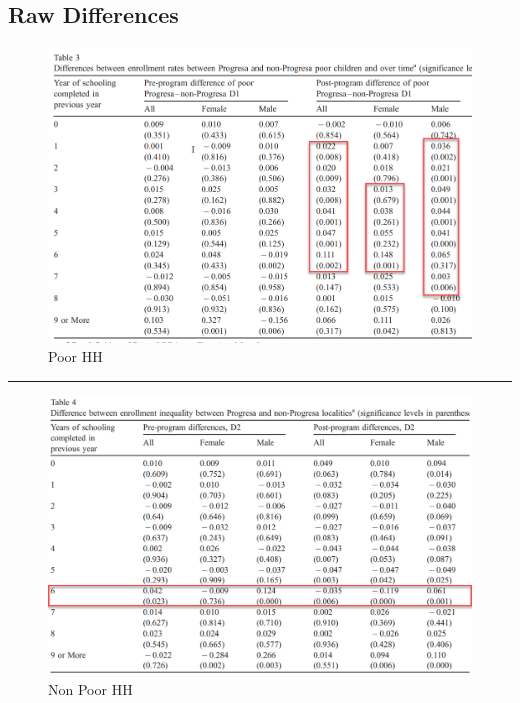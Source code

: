 \documentclass[
  letterpaper,
  DIV=11,
  numbers=noendperiod]{scrartcl}
\begin{document}
\hypertarget{raw-differences}{%
\subsection{Raw Differences}\label{raw-differences}}

\begin{figure}

{\centering \includegraphics{./po_ci_files/fig1.png}

}

\caption{Poor HH}

\end{figure}

\begin{center}\rule{0.5\linewidth}{0.5pt}\end{center}

\begin{figure}

{\centering \includegraphics{./po_ci_files/fig2.png}

}

\caption{Non Poor HH}

\end{figure}
\end{document}
